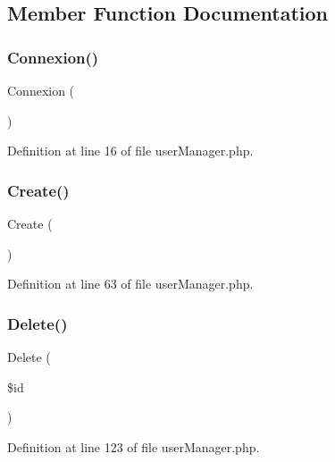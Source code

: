 \subsection{Member Function Documentation}
\mbox{\label{class_src_1_1_managers_1_1user_manager_a00fdd5c0ca353b468ea33fb246c28d90}} 
\subsubsection{Connexion()}
{\footnotesize\ttfamily Connexion (\begin{DoxyParamCaption}{ }\end{DoxyParamCaption})}



Definition at line 16 of file user\+Manager.\+php.

\mbox{\label{class_src_1_1_managers_1_1user_manager_ad01f71fa0ecc039494e3c282864298c3}} 
\subsubsection{Create()}
{\footnotesize\ttfamily Create (\begin{DoxyParamCaption}{ }\end{DoxyParamCaption})}



Definition at line 63 of file user\+Manager.\+php.

\mbox{\label{class_src_1_1_managers_1_1user_manager_a59113b5ecd1d155db6a4f30af34a1e80}} 
\subsubsection{Delete()}
{\footnotesize\ttfamily Delete (\begin{DoxyParamCaption}\item[{}]{\$id }\end{DoxyParamCaption})}



Definition at line 123 of file user\+Manager.\+php.

